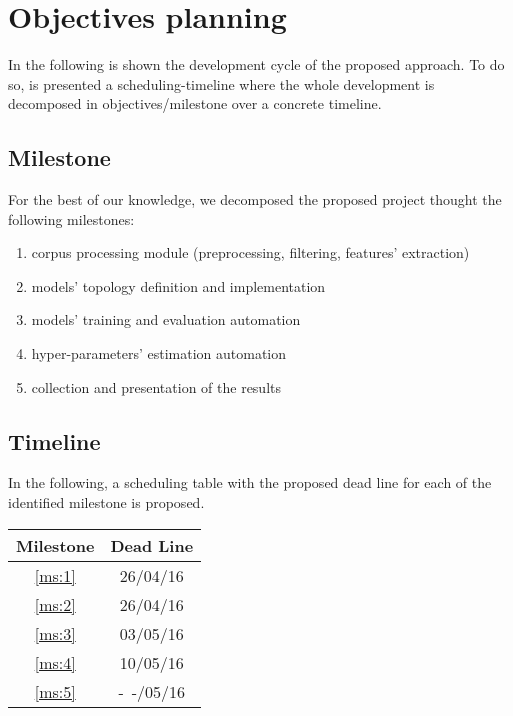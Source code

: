 \chapter{Objectives planning} \label{chapter:planning}

In the following is shown the development cycle of the proposed approach. To do so, is presented a scheduling-timeline where the whole development is decomposed in objectives/milestone over a concrete timeline.


\section{Milestone}

For the best of our knowledge, we decomposed the proposed project thought the following milestones:

\begin{enumerate}
\item \label{ms:1} corpus processing module (preprocessing, filtering, features' extraction)
\item \label{ms:2} models' topology definition and implementation
\item \label{ms:3} models' training and evaluation automation
\item \label{ms:4} hyper-parameters' estimation automation
\item \label{ms:5} collection and presentation of the results
\end{enumerate}

\section{Timeline}

In the following, a scheduling table with the proposed dead line for each of the identified milestone is proposed.

\begin{table}[h]
\centering
\begin{tabular}{|c|c|}
\hline
Milestone 	& Dead Line \\ \hline
\ref{ms:1}	& 26/04/16  \\ \hline
\ref{ms:2}	& 26/04/16  \\ \hline
\ref{ms:3}	& 03/05/16  \\ \hline
\ref{ms:4}	& 10/05/16  \\ \hline
\ref{ms:5}	& -~-/05/16  \\ \hline
\end{tabular}
\end{table}